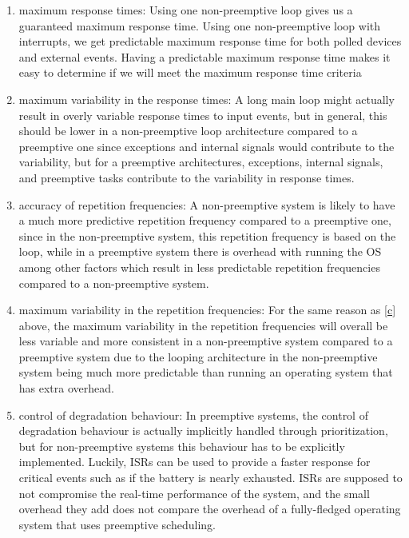 \begin{enumerate}[label={\alph*)}]
  \item maximum response times:
    Using one non-preemptive loop gives us a guaranteed maximum response time. 
    Using one non-preemptive loop with interrupts, we get predictable maximum
    response time for both polled devices and external events.
    Having a predictable maximum response time makes it easy to determine if
    we will meet the maximum response time criteria

  \item maximum variability in the response times: 
    A long main loop might actually result in overly variable response times to
    input events, but in general, this should be lower in a non-preemptive loop
    architecture compared to a preemptive one since exceptions and internal
    signals would contribute to the variability, but for a preemptive
    architectures,  exceptions, internal signals, and preemptive tasks
    contribute to the variability in response times. 

  \item accuracy of repetition frequencies:\label{c}
    A non-preemptive system is likely to have a much more predictive repetition
    frequency compared to a preemptive one, since in the non-preemptive system,
    this repetition frequency is based on the loop, while in a preemptive
    system there is overhead with running the OS among other factors which
    result in less predictable repetition frequencies compared to a
    non-preemptive system.

  \item maximum variability in the repetition frequencies:
    For the same reason as \ref{c} above, the maximum variability in the
    repetition frequencies will overall be less variable and more consistent in
    a non-preemptive system compared to a preemptive system due to the looping
    architecture in the non-preemptive system being much more predictable than
    running an operating system that has extra overhead.

  \item control of degradation behaviour:
    In preemptive systems, the control of degradation behaviour is actually
    implicitly handled through prioritization, but for non-preemptive systems
    this behaviour has to be explicitly implemented. Luckily, ISRs can be used
    to provide a faster response for critical events such as if the battery is
    nearly exhausted. ISRs are supposed to not compromise the real-time
    performance of the system, and the small overhead they add does not compare
    the overhead of a fully-fledged operating system that uses preemptive
    scheduling.
\end{enumerate}
